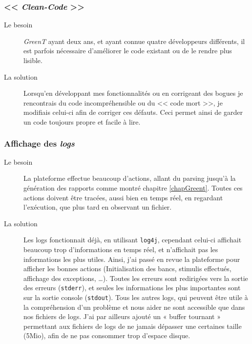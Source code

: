 	\subsubsection{<< \textit{Clean-Code} >>}
		\begin{description}
			\item[Le besoin] \textit{GreenT} ayant deux ans, et ayant connue quatre développeurs différents, il est parfois nécessaire d'améliorer le code existant ou de le rendre plus lisible. 
			\item[La solution] Lorsqu'en développant mes fonctionnalités ou en corrigeant des bogues je rencontrais du code incompréhensible ou du << code mort >>, je modifiais celui-ci afin de corriger ces défauts. Ceci permet ainsi de garder un code toujours propre et facile à lire.
		\end{description}
		
	\subsubsection{Affichage des \textit{logs}}
		\begin{description}
			\item[Le besoin] La plateforme effectue beaucoup d'actions, allant du parsing jusqu'à la génération des rapports comme montré chapitre \ref{chapGreent}. Toutes ces actions doivent être tracées, aussi bien en temps réel, en regardant l'exécution, que plus tard en observant un fichier.
			\item[La solution] Les logs fonctionnait déjà, en utilisant \texttt{log4j}, cependant celui-ci affichait beaucoup trop d'informations en temps réel, et n'affichait pas les informations les plus utiles. Ainsi, j'ai passé en revue la plateforme pour afficher les bonnes actions (Initialisation des bancs, stimulis effectués, affichage des exceptions, \ldots). Toutes les erreurs sont redirigées vers la sortie des erreurs (\texttt{stderr}), et seules les informations les plus importantes sont sur la sortie console (\texttt{stdout}). Tous les autres logs, qui peuvent être utile à la compréhension d'un problème et nous aider ne sont accessible que dans nos fichiers de logs. J'ai par ailleurs ajouté un « buffer tournant » permettant aux fichiers de logs de ne jamais dépasser une certaines taille (5Mio), afin de ne pas consommer trop d'espace disque.
		\end{description}
		

